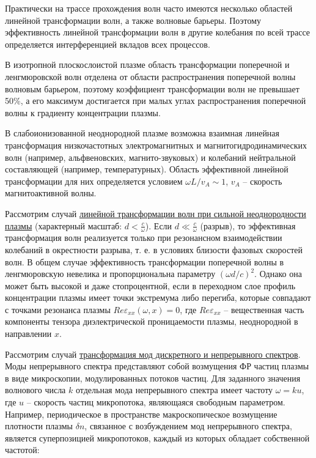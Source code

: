 \documentclass[10pt, a4paper]{article}
\begin{document}
\begin{enumerate}
	Практически на трассе прохождения волн часто имеются несколько областей линейной трансформации волн, а также волновые барьеры. Поэтому эффективность линейной трансформации волн в другие колебания по всей трассе определяется интерференцией вкладов всех процессов.
	
	В изотропной плоскослоистой плазме область трансформации поперечной и ленгмюровской волн отделена от области распространения поперечной волны волновым барьером, поэтому коэффициент трансформации волн не превышает 50\%, а его максимум достигается при малых углах распространения поперечной волны к градиенту концентрации плазмы.
	
	В слабоионизованной неоднородной плазме возможна взаимная линейная трансформация низкочастотных электромагнитных и магнитогидродинамических волн (например, альфвеновских, магнито-звуковых) и колебаний нейтральной составляющей (например, температурных). Область эффективной линейной трансформации для них определяется условием $\omega L/v_A\sim 1$, $v_A$ -- скорость магнитоактивной волны.
	
\end{enumerate}

Рассмотрим случай \uline{линейной трансформации волн при сильной неоднородности плазмы} (характерный масштаб: $d<\frac{c}{\omega}$). Если $d\ll\frac{c}{\omega}$ (разрыв), то эффективная трансформация волн реализуется только при резонансном взаимодействии колебаний в окрестности разрыва, т. е. в условиях близости фазовых скоростей волн. В общем случае эффективность трансформации поперечной волны в ленгмюровскую невелика и пропорциональна параметру $(\omega d/c)^2$. Однако она может быть высокой и даже стопроцентной, если в переходном слое профиль концентрации плазмы имеет точки экстремума либо перегиба, которые совпадают с точками резонанса плазмы $Re\varepsilon_{xx}(\omega, x)=0$, где $Re\varepsilon_{xx}$ -- вещественная часть компоненты тензора диэлектрической проницаемости плазмы, неоднородной в направлении $x$.

Рассмотрим случай \uline{трансформация мод дискретного и непрерывного спектров}. Моды непрерывного спектра представляют собой возмущения ФР частиц плазмы в виде микроскопии, модулированных потоков частиц. Для заданного значения волнового числа $k$ отдельная мода непрерывного спектра имеет частоту $\omega=ku$, где $u$ -- скорость частиц микропотока, являющаяся свободным параметром. Например, периодическое в пространстве макроскопическое возмущение плотности плазмы $\delta n$, связанное с возбуждением мод непрерывного спектра, является суперпозицией микропотоков, каждый из которых обладает собственной частотой:
\end{document}
